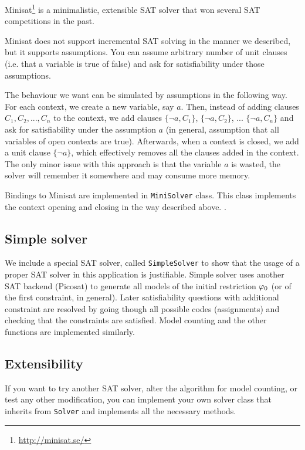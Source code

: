 Minisat\footnote{\url{http://minisat.se/}} \cite{minisat} is a minimalistic,
  extensible SAT solver that won several SAT competitions in the past.

Minisat does not support incremental SAT solving in the manner we described,
  but it supports assumptions.
You can assume arbitrary number of unit clauses
  (i.e. that a variable is true of false) and ask for satisfiability under
  those assumptions.

The behaviour we want can be simulated by assumptions in the following way.
For each context, we create a new variable, say $a$.
Then, instead of adding clauses $C_1, C_2, ..., C_n$ to the context,
  we add clauses $\{\neg a, C_1\}$, $\{\neg a, C_2\}$, ... $\{\neg a, C_n\}$ and ask
  for satisfiability under the assumption $a$ (in general,
  assumption that all variables of open contexts are true).
Afterwards, when a context is closed, we add a unit clause $\{\neg a\}$,
  which effectively removes all the clauses added in the context.
The only minor issue with this approach is that the variable $a$ is wasted,
  the solver will remember it somewhere and may consume more memory.

Bindings to Minisat are implemented in \texttt{MiniSolver} class.
This class implements the context opening and closing in the way described above.
.

\subsection{Simple solver}

We include a special SAT solver, called \texttt{SimpleSolver} to show that
  the usage of a proper SAT solver in this application is justifiable.
Simple solver uses another SAT backend (Picosat) to generate all
  models of the initial restriction $\varphi_0$ (or of the first constraint, in general).
Later satisfiability questions with additional constraint are
  resolved by going though all possible codes (assignments) and
  checking that the constraints are satisfied.
Model counting and the other functions are implemented similarly.

\subsection{Extensibility}
If you want to try another SAT solver, alter the algorithm for model counting,
  or test any other modification,
  you can implement your own solver class that inherits from \texttt{Solver} and
  implements all the necessary methods.

